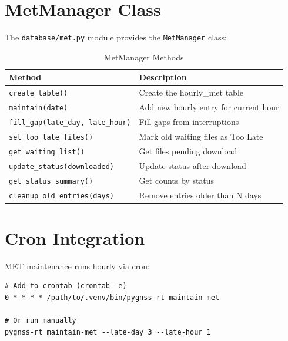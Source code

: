 \documentclass[11pt,a4paper,twoside]{report}
\newcommand{\code}[1]{\texttt{\small\color{primaryblue}#1}}
\newcommand{\pyfile}[1]{\texttt{\color{primaryblue!80!black}#1}}
\begin{document}
\section{MetManager Class}

The \pyfile{database/met.py} module provides the \code{MetManager} class:

\begin{table}[H]
\centering
\caption{MetManager Methods}
\label{tab:met-methods}
\begin{tabular}{@{}lp{7cm}@{}}
\toprule
\textbf{Method} & \textbf{Description} \\
\midrule
\code{create\_table()} & Create the hourly\_met table \\
\code{maintain(date)} & Add new hourly entry for current hour \\
\code{fill\_gap(late\_day, late\_hour)} & Fill gaps from interruptions \\
\code{set\_too\_late\_files()} & Mark old waiting files as Too Late \\
\code{get\_waiting\_list()} & Get files pending download \\
\code{update\_status(downloaded)} & Update status after download \\
\code{get\_status\_summary()} & Get counts by status \\
\code{cleanup\_old\_entries(days)} & Remove entries older than N days \\
\bottomrule
\end{tabular}
\end{table}

\section{Cron Integration}

MET maintenance runs hourly via cron:

\begin{lstlisting}[style=bashstyle, caption={Cron Job for MET Maintenance}, label={lst:met-cron}]
# Add to crontab (crontab -e)
0 * * * * /path/to/.venv/bin/pygnss-rt maintain-met

# Or run manually
pygnss-rt maintain-met --late-day 3 --late-hour 1
\end{lstlisting}

\end{document}
